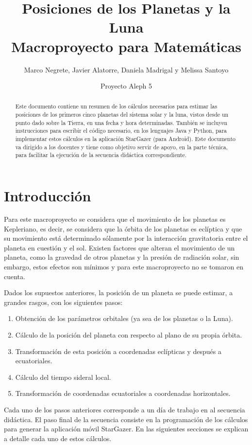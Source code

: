 \documentclass[a4paper,10pt]{article}
\title{Posiciones de los Planetas y la Luna \\ Macroproyecto para Matemáticas}
\author{Marco Negrete, Javier Alatorre, Daniela Madrigal y Melissa Santoyo}
\date{Proyecto Aleph 5}
\begin{document}
\renewcommand{\tablename}{Tabla}
\renewcommand{\BOthers}[1]{et al.\hbox{}}
\maketitle

\begin{abstract}
  Este documento contiene un resumen de los cálculos necesarios para estimar las posiciones de los primeros cinco planetas del sistema solar y la luna, vistos desde un punto dado sobre la Tierra, en una fecha y hora determinadas. También se incluyen instrucciones para escribir el código necesario, en los lenguajes Java y Python, para implementar estos cálculos en la aplicación StarGazer (para Android). Este documento va dirigido a los docentes y tiene como objetivo servir de apoyo, en la parte técnica, para facilitar la ejecución de la secuencia didáctica correspondiente. 
\end{abstract}

\section{Introducción}
Para este macroproyecto se considera que el movimiento de los planetas es Kepleriano, es decir, se considera que la órbita de los planetas es eclíptica y que su movimiento está determinado sólamente por la interacción gravitatoria entre el planeta en cuestión y el sol. Existen factores que alteran el movimiento de un planeta, como la gravedad de otros planetas y la presión de radiación solar, sin embargo, estos efectos son mínimos y para este macroproyecto no se tomaron en cuenta. 

Dados los supuestos anteriores, la posición de un planeta se puede estimar, a grandes rasgos, con los siguientes pasos:
\begin{enumerate}
\item Obtención de los parámetros orbitales (ya sea de los planetas o la Luna).
\item Cálculo de la posición del planeta con respecto al plano de su propia órbita.
\item Transformación de esta posición a coordenadas eclípticas y después a ecuatoriales.
\item Cálculo del tiempo sideral local.
\item Transformación de coordenadas ecuatoriales a coordenadas horizontales.
\end{enumerate}

Cada uno de los pasos anteriores corresponde a un día de trabajo en al secuencia didáctica. El paso final de la secuencia consiste en la programación de los cálculos para generar la aplicación móvil StarGazer. En las siguientes secciones se explican a detalle cada uno de estos cálculos.
\end{document}
